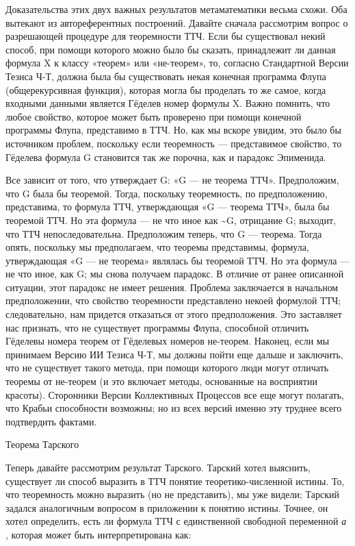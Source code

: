 \documentclass[../main.tex]{subfiles}
\begin{document}
Доказательства этих двух важных результатов метаматематики весьма схожи. Оба вытекают из автореферентных построений. Давайте сначала рассмотрим вопрос о разрешающей процедуре для теоремности ТТЧ. Если бы существовал некий способ, при помощи которого можно было бы сказать, принадлежит ли данная формула X к классу «теорем» или «не-теорем», то, согласно Стандартной Версии Тезиса Ч-Т, должна была бы существовать некая конечная программа Флупа (общерекурсивная функция), которая могла бы проделать то же самое, когда входными данными является Гёделев номер формулы X. Важно помнить, что любое свойство, которое может быть проверено при помощи конечной программы Флупа, представимо в ТТЧ. Но, как мы вскоре увидим, это было бы источником проблем, поскольку если теоремность --- представимое свойство, то Гёделева формула G становится так же порочна, как и парадокс Эпименида.

Все зависит от того, что утверждает G: «G --- не теорема ТТЧ». Предположим, что G была бы теоремой. Тогда, поскольку теоремность, по предположению, представима, то формула ТТЧ, утверждающая «G --- теорема ТТЧ», была бы теоремой ТТЧ. Но эта формула --- не что иное как \textasciitilde G, отрицание G; выходит, что ТТЧ непоследовательна. Предположим теперь, что G --- теорема. Тогда опять, поскольку мы предполагаем, что теоремы представимы, формула, утверждающая «G --- не теорема» являлась бы теоремой ТТЧ. Но эта формула --- не что иное, как G; мы снова получаем парадокс. В отличие от ранее описанной ситуации, этот парадокс не имеет решения. Проблема заключается в начальном предположении, что свойство теоремности представлено некоей формулой ТТЧ; следовательно, нам придется отказаться от этого предположения. Это заставляет нас признать, что не существует программы Флупа, способной отличить Гёделевы номера теорем от Гёделевых номеров не-теорем. Наконец, если мы принимаем Версию ИИ Тезиса Ч-Т, мы должны пойти еще дальше и заключить, что не существует такого метода, при помощи которого люди могут отличать теоремы от не-теорем (и это включает методы, основанные на восприятии красоты). Сторонники Версии Коллективных Процессов все еще могут полагать, что Крабьи способности возможны; но из всех версий именно эту труднее всего подтвердить фактами.

Теорема Тарского

Теперь давайте рассмотрим результат Тарского. Тарский хотел выяснить, существует ли способ выразить в ТТЧ понятие теоретико-численной истины. То, что теоремность можно выразить (но не представить), мы уже видели; Тарский задался аналогичным вопросом в приложении к понятию истины. Точнее, он хотел определить, есть ли формула ТТЧ с единственной свободной переменной \emph{а} , которая может быть интерпретирована как:
\end{document}

